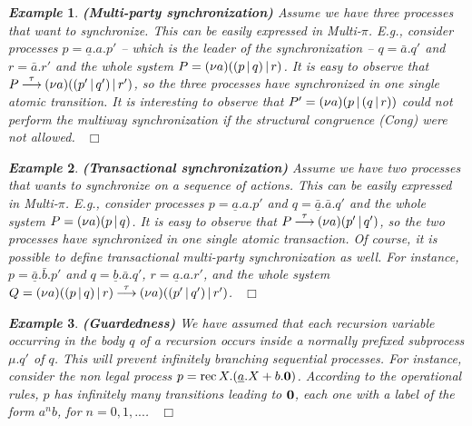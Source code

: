 \documentclass[submission,copyright,creativecommons]{eptcs}
\newcommand{\fine}{{\mbox{ }\nolinebreak\hfill{$\Box$}}}
\newcommand{\deriv}[1]{{\mbox{${\:\stackrel{#1}{\longrightarrow}\:}$}}}
\newcommand{\restr}[1]{\mbox{$({\bf\nu} #1)$}}
\newcommand{\para}{\mbox{$\,|\,$}}
\newcommand{\recx}[1]{\mbox{rec$\, X.#1$}}
\newcommand{\nil}{\mbox{\bf 0}}
\newtheorem{aexample}{\it Example}
\newenvironment{example}{\begin{aexample} }{\end{aexample}}
\begin{document}
\begin{example}\label{multi-synch}{\bf (Multi-party synchronization)} Assume we have three processes that want to synchronize. 
This can be easily expressed in Multi-$\pi$. E.g., consider processes $p = \underline{a}.a.p'$ -- which is the leader of the synchronization --
$q = \bar{a}.q'$ and $r = \bar{a}.r'$ and the whole system $P = \restr{a}((p \para q) \para r)$. It is easy to observe
that $P \deriv{\tau} \restr{a}((p' \para q') \para r')$, so the three processes have synchronized in one single atomic transition.
It is interesting to observe that $P' = \restr{a}(p \para (q \para r))$ could not
perform the multiway synchronization if the structural congruence (Cong) were not allowed.
\fine
\end{example}

\begin{example}\label{trans-synch}{\bf (Transactional synchronization)} Assume we have two processes that wants to synchronize
on a sequence of actions. 
This can be easily expressed in Multi-$\pi$. E.g., consider processes $p = \underline{a}.a.p'$ and
$q =\underline{\bar{a}}.\bar{a}.q'$ and the whole system $P = \restr{a}(p \para q)$. It is easy to observe
that $P \deriv{\tau} \restr{a}(p' \para q')$, so the two processes have synchronized in one single atomic transaction.
Of course, it is possible to define transactional multi-party synchronization as well. For instance,  
$p =\underline{\bar{a}}.\bar{b}.p'$ and $q = \underline{b}.\bar{a}.q'$, $r = \underline{a}.a.r'$, and the whole system $Q =
 \restr{a}((p \para q) \para r) \deriv{\tau} \restr{a}((p' \para q') \para r')$.
\fine
\end{example}

\begin{example}\label{guarded-rec}{\bf (Guardedness)} We have assumed that each 
recursion variable occurring 
in the body $q$ of a recursion occurs inside a  normally prefixed subprocess $\mu.q'$ of $q$. 
This will prevent infinitely branching sequential processes.
For instance, consider the non legal process $p = \recx {(\underline{a}.X + b.\nil)}$.
According to the operational rules, $p$ has infinitely many transitions leading to $\nil$, each one with a label of the form $a^nb$, for 
$n = 0, 1, ...$. 
%
\fine
\end{example}
\end{document}
